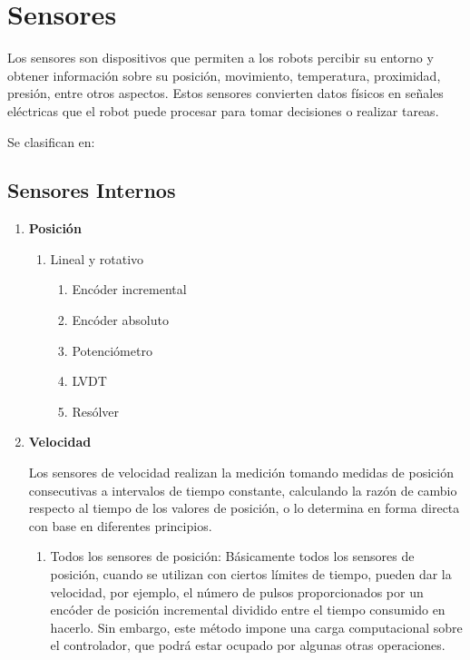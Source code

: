  \section{Sensores}
	Los sensores son dispositivos que permiten a los robots percibir su entorno y obtener información sobre su posición, movimiento, temperatura, proximidad, presión, entre otros aspectos. Estos sensores convierten datos físicos en señales eléctricas que el robot puede procesar para tomar decisiones o realizar tareas.

Se clasifican en:

	\subsection{Sensores Internos}
		\begin{enumerate}
			\item \textbf{Posición}
			\begin{enumerate}
				\item Lineal y rotativo
				\begin{enumerate}
					\item Encóder incremental
					\item Encóder absoluto
					\item Potenciómetro
					\item LVDT
					\item Resólver
				\end{enumerate}
			\end{enumerate}
			
			\item \textbf{Velocidad}
			
            Los sensores de velocidad realizan la medición tomando medidas de posición consecutivas a intervalos de tiempo constante, calculando la razón de cambio respecto al tiempo de los valores de posición, o lo determina en forma directa con base en diferentes principios.\cite{saha2010robotics}\\
           
			
			\begin{enumerate}
				\item Todos los sensores de posición:
				Básicamente todos los sensores de posición, cuando se utilizan con ciertos límites de tiempo, pueden dar la velocidad, por ejemplo, el número de pulsos proporcionados por un encóder de posición incremental dividido entre el tiempo consumido en hacerlo. Sin embargo, este método impone una carga computacional sobre el controlador, que podrá estar ocupado por algunas otras operaciones.\\
		

\end{enumerate}
\end{enumerate}
